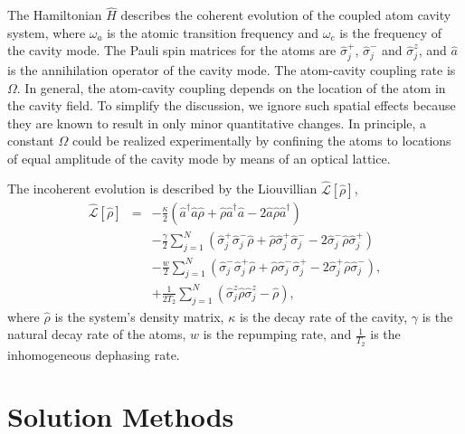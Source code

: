 \documentclass[aps,
twocolumn,
superscriptaddress,groupedaddress]{revtex4}
\begin{document}
The Hamiltonian $\hat{H}$ describes the coherent evolution of the
coupled atom cavity system, where $\omega_{a}$ is the atomic transition
frequency and $\omega_c$ is the frequency of the cavity mode. The Pauli
spin matrices for the atoms are $\hat{\sigma}_j^{+}$,
$\hat{\sigma}_j^{-}$ and $\hat{\sigma}_j^{z}$, and $\hat{a}$ is the
annihilation operator of the cavity mode. The atom-cavity coupling rate
is $\Omega$.  In general, the atom-cavity coupling depends on the
location of the atom in the cavity field.  To simplify the discussion, we ignore
such spatial effects because they are known to result in only minor
quantitative changes.  In principle, a constant $\Omega$ could be
realized experimentally by confining the atoms to locations of equal
amplitude of the cavity mode by means of an optical lattice.

The incoherent evolution is described by the Liouvillian
$\hat{\mathcal{L}}\left[ \hat{\rho} \right]$,
\begin{eqnarray}
\hat{\mathcal{L}}\left[ \hat{\rho} \right] &=&
  -\frac{\kappa}{2}
  \left(
    \hat{a}^{\dagger} \hat{a} \hat{\rho}
    + \hat{\rho}  \hat{a}^{\dagger} \hat{a}
    - 2\hat{a} \hat{\rho} \hat{a}^{\dagger}
  \right)
\nonumber
\\
 &&-\frac{\gamma}{2} \sum_{j=1}^N
  \left(
   \hat{\sigma}_{j}^{+} \hat{\sigma}_{j}^{-} \hat{\rho}
   + \hat{\rho} \hat{\sigma}_{j}^{+} \hat{\sigma}_{j}^{-}
   - 2\hat{\sigma}_{j}^{-} \hat{\rho} \hat{\sigma}_{j}^{+}
  \right)
\nonumber
\\
 &&-\frac{w}{2} \sum_{j=1}^N
  \left(
   \hat{\sigma}_{j}^{-} \hat{\sigma}_{j}^{+} \hat{\rho}
   + \hat{\rho} \hat{\sigma}_{j}^{-} \hat{\sigma}_{j}^{+}
   - 2\hat{\sigma}_{j}^{+} \hat{\rho}  \hat{\sigma}_{j}^{-}
  \right),
\nonumber
\\
 &&+\frac{1}{2T_2} \sum_{j=1}^N
  \left(
   \hat{\sigma}_{j}^{z} \hat{\rho}  \hat{\sigma}_{j}^{z} - \hat{\rho}
  \right),
\end{eqnarray}
where $\hat{\rho}$ is the system's density matrix, $\kappa$ is the decay
rate of the cavity, $\gamma$ is the natural decay rate of the atoms, $w$
is the repumping rate, and $\frac{1}{T_2}$ is the inhomogeneous
dephasing rate.


\section{Solution Methods}
\label{sec:Methods}
\end{document}
